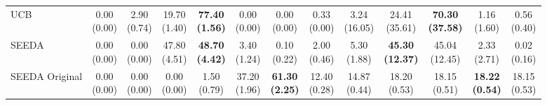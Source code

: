 \begin{table}[H]
{\begin{tabular}{l|cccccc|cccccc}
UCB & \makecell{0.00 \\ (0.00)} & \makecell{2.90 \\ (0.74)} & {\cellcolor[HTML]{C8E6C9}} \makecell{19.70 \\ (1.40)} & \bfseries \makecell{77.40 \\ (1.56)} & \makecell{0.00 \\ (0.00)} & \makecell{0.00 \\ (0.00)} & \makecell{0.33 \\ (0.00)} & \makecell{3.24 \\ (16.05)} & {\cellcolor[HTML]{C8E6C9}} \makecell{24.41 \\ (35.61)} & \bfseries \makecell{70.30 \\ (37.58)} & \makecell{1.16 \\ (1.60)} & \makecell{0.56 \\ (0.40)} \\
SEEDA & \makecell{0.00 \\ (0.00)} & \makecell{0.00 \\ (0.00)} & {\cellcolor[HTML]{C8E6C9}} \makecell{47.80 \\ (4.51)} & \bfseries \makecell{48.70 \\ (4.42)} & \makecell{3.40 \\ (1.24)} & \makecell{0.10 \\ (0.22)} & \makecell{2.00 \\ (0.46)} & \makecell{5.30 \\ (1.88)} & {\cellcolor[HTML]{C8E6C9}} \bfseries \makecell{45.30 \\ (12.37)} & \makecell{45.04 \\ (12.45)} & \makecell{2.33 \\ (2.71)} & \makecell{0.02 \\ (0.16)} \\
SEEDA Original & \makecell{0.00 \\ (0.00)} & \makecell{0.00 \\ (0.00)} & {\cellcolor[HTML]{C8E6C9}} \makecell{0.00 \\ (0.00)} & \makecell{1.50 \\ (0.79)} & \makecell{37.20 \\ (1.96)} & \bfseries \makecell{61.30 \\ (2.25)} & \makecell{12.40 \\ (0.28)} & \makecell{14.87 \\ (0.44)} & {\cellcolor[HTML]{C8E6C9}} \makecell{18.20 \\ (0.53)} & \makecell{18.15 \\ (0.51)} & \bfseries \makecell{18.22 \\ (0.54)} & \makecell{18.15 \\ (0.53)} \\

\end{tabular}}
\end{table}
